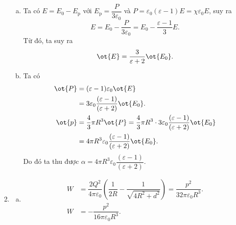 \begin{loigiai}
\begin{enumerate}[1)]
\begin{enumerate}[a)]
        \item Ta có $E=E_{\mathrm{0}}-E_{\mathrm{p}}$ với $E_{\mathrm{p}}=\dfrac{P}{3\varepsilon_0}$ và $P=\varepsilon_0(\varepsilon-1)E=\chi\varepsilon_0E$, suy ra
        \[ E=E_0-\dfrac{P}{3\varepsilon_0}=E_0-\dfrac{\varepsilon-1}{3}E.\]
        Từ đó, ta suy ra
        \[\ot{E}=\dfrac{3}{\varepsilon+2}\ot{E_0}.\]
        \item Ta có
        \begin{align*}
            \ot{P}&=(\varepsilon-1)\varepsilon_0\ot{E}\\
            &=3\varepsilon_0\dfrac{(\varepsilon-1)}{(\varepsilon+2)}\ot{E_0}.\\
            \ot{p}&=\dfrac{4}{3}\pi R^3 \ot{P}=\dfrac{4}{3}\pi R^3\cdot3\varepsilon_0\dfrac{(\varepsilon-1)}{(\varepsilon+2)}\ot{E_0}\\
            &=4\pi R^3 \varepsilon_0 \dfrac{(\varepsilon-1)}{(\varepsilon+2)}\ot{E_0}.
        \end{align*}
        Do đó ta thu được $\alpha=4\pi R^3 \varepsilon_0 \dfrac{(\varepsilon-1)}{(\varepsilon+2)}$.
    \end{enumerate}
    \item 
    \begin{enumerate}[a)]
        \item
        \begin{align*}
        W&=\dfrac{2Q^2}{4\pi\varepsilon_0}\left(\dfrac{1}{2R}-\dfrac{1}{\sqrt{4R^2+d^2}}\right)=\dfrac{p^2}{32\pi\varepsilon_0R^3}.\\
        W&=-\dfrac{p^2}{16\pi\varepsilon_0R^3} .
        \end{align*}
  

\end{enumerate}
\end{enumerate}
\end{loigiai}
